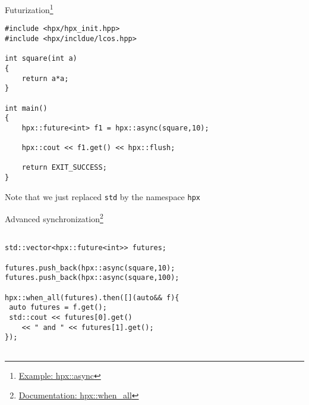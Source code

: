 \documentclass[\classoption]{beamer}
\begin{document}
\begin{frame}[fragile]{Futurization\footnote{\tiny\href{https://stellar-group.github.io/hpx/docs/sphinx/latest/html/examples/fibonacci_local.html?highlight=async}{Example: hpx::async}}}

\begin{lstlisting}
#include <hpx/hpx_init.hpp>
#include <hpx/incldue/lcos.hpp>

int square(int a)
{ 
    return a*a; 
}

int main()
{
    hpx::future<int> f1 = hpx::async(square,10); 
    
    hpx::cout << f1.get() << hpx::flush;
    
    return EXIT_SUCCESS;
}

\end{lstlisting}
\vspace{-0.25cm}
\begin{center}
Note that we just replaced \lstinline|std| by the namespace \lstinline|hpx|
\end{center}
\end{frame}


\begin{frame}[fragile]{Advanced synchronization\footnote{\tiny\href{https://stellar-group.github.io/hpx/docs/sphinx/latest/html/api.html?highlight=when_all\#_CPPv4IDpEN3hpx8when_allE6futureI5tupleIDp6futureI1TEEEDpRR1T}{Documentation: hpx::when\_all}}}

\begin{lstlisting}

std::vector<hpx::future<int>> futures;

futures.push_back(hpx::async(square,10);
futures.push_back(hpx::async(square,100);

hpx::when_all(futures).then([](auto&& f){
 auto futures = f.get();
 std::cout << futures[0].get() 
 	<< " and " << futures[1].get();
});


\end{lstlisting}

\end{frame}
\end{document}
